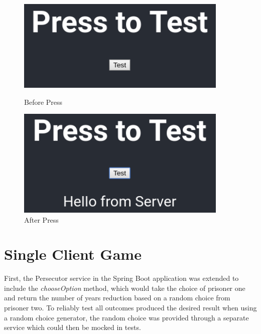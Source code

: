 \documentclass[12pt]{article}
\begin{document}
\begin{figure}[!ht]
    \centering
    \begin{minipage}{0.45\textwidth}
        \centering
        \includegraphics[width=0.9\textwidth]{images/part1pretest} %
        \caption{Before Press}
        \label{fig:beforepress}
    \end{minipage}\hfill
    \begin{minipage}{0.45\textwidth}
        \centering
        \includegraphics[width=0.9\textwidth]{images/part1posttest} %
        \caption{After Press}
        \label{fig:afterpress}
    \end{minipage}
\end{figure}

\part{Single Client Game}

First, the Persecutor service in the Spring Boot application was extended to include the \emph{chooseOption} method, which would take the choice of prisoner one and return the number of years reduction based on a random choice from prisoner two. To reliably test all outcomes produced the desired result when using a random choice generator, the random choice was provided through a separate service which could then be mocked in tests. 
\end{document}

